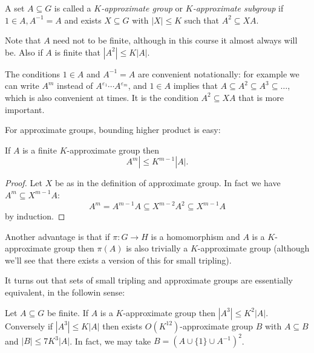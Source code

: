 \documentclass[a4paper]{article}
\begin{document}
\begin{definition}
  A set \(A \subseteq G\) is called a \emph{\(K\)-approximate group} or \emph{\(K\)-approximate subgroup} if \(1 \in A, A^{-1} = A\) and exists \(X \subseteq G\) with \(|X| \leq K\) such that \(A^2 \subseteq XA\).
\end{definition}

\begin{remark}
  Note that \(A\) need not to be finite, although in this course it almost always will be. Also if \(A\) is finite that \(|A^2| \leq K|A|\).
\end{remark}

The conditions \(1 \in A\) and \(A^{-1} = A\) are convenient notationally: for example we can write \(A^m\) instead of \(A^{\varepsilon_1} \cdots A^{\varepsilon_m}\), and \(1 \in A\) implies that \(A \subseteq A^2 \subseteq A^3 \subseteq \dots\), which is also convenient at times. It is the condition \(A^2 \subseteq XA\) that is more important.

For approximate groups, bounding higher product is easy:

\begin{lemma}[lemma 3.1]
  If \(A\) is a finite \(K\)-approximate group then
  \[
    A^m| \leq K^{m - 1}|A|.
  \]
\end{lemma}

\begin{proof}
  Let \(X\) be as in the definition of approximate group. In fact we have \(A^m \subseteq X^{m - 1}A\):
  \[
    A^m
    = A^{m - 1} A
    \subseteq X^{m - 2} A^2
    \subseteq X^{m - 1} A
  \]
  by induction.
\end{proof}

Another advantage is that if \(\pi: G \to H\) is a homomorphism and \(A\) is a \(K\)-approximate group then \(\pi(A)\) is also trivially a \(K\)-approximate group (although we'll see that there exists a version of this for small tripling).

It turns out that sets of small tripling and approximate groups are essentially equivalent, in the followin sense:

\begin{proposition}[proposition 3.2]
  Let \(A \subseteq G\) be finite. If \(A\) is a \(K\)-approximate group then \(|A^3| \leq K^2 |A|\). Conversely if \(|A^3| \leq K |A|\) then exists \(O(K^{12})\)-approximate group \(B\) with \(A \subseteq B\) and \(|B| \leq 7K^3 |A|\). In fact, we may take \(B = (A \cup \{1\} \cup A^{-1})^2\).
\end{proposition}
\end{document}
